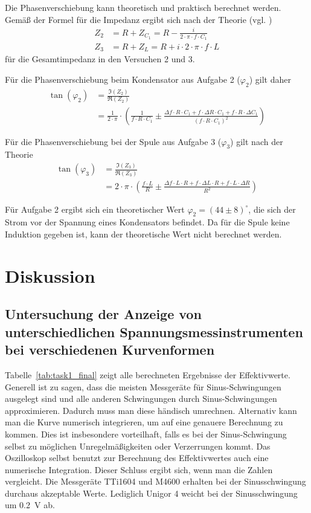 \documentclass{article}
\begin{document}
Die Phasenverschiebung kann theoretisch und praktisch berechnet werden. Gemäß der Formel für die Impedanz ergibt sich nach der Theorie (vgl. \cite{demtroeder})
\begin{align*}
Z_2 &= R + Z_{C_1} = R - \frac{i}{2\cdot\pi\cdot f \cdot C_1} \\
Z_3 &= R + Z_{L} = R + i\cdot 2\cdot\pi\cdot f \cdot L
\end{align*}
für die Gesamtimpedanz in den Versuchen 2 und 3.

Für die Phasenverschiebung beim Kondensator aus Aufgabe 2 ($\varphi_2$) gilt daher
\begin{align*}
\tan\left(\varphi_2\right) &= \frac{\Im(Z_2)}{\Re(Z_2)} \\
&= \frac{1}{2\cdot\pi} \cdot\left(\frac{1}{ f\cdot R \cdot C_1} \pm  \frac{\Delta f\cdot R \cdot C_1 + f\cdot \Delta R \cdot C_1 + f\cdot R \cdot \Delta C_1}{ (f \cdot R\cdot C_1)^2} \right)
\end{align*}

Für die Phasenverschiebung bei der Spule aus Aufgabe 3 ($\varphi_3$) gilt nach der Theorie
\begin{align*}
\tan\left(\varphi_3\right) &= \frac{\Im(Z_3)}{\Re(Z_3)} \\
&= 2\cdot \pi\cdot \left( \frac{f \cdot L}{R} \pm \frac{\Delta f\cdot L\cdot R + f\cdot \Delta L\cdot R + f\cdot L \cdot \Delta R}{R^2} \right)
\end{align*}


Für Aufgabe 2 ergibt sich ein theoretischer Wert $\varphi_2 = (44 \pm 8)^\circ$, die sich der Strom vor der Spannung eines Kondensators befindet. Da für die Spule keine Induktion gegeben ist, kann der theoretische Wert nicht berechnet werden.



\section{Diskussion}


\subsection{Untersuchung  der  Anzeige  von  unterschiedlichen  Spannungsmessinstrumenten  bei verschiedenen Kurvenformen }

Tabelle~\ref{tab:task1_final} zeigt alle berechneten Ergebnisse der Effektivwerte. Generell ist zu sagen, dass die meisten Messgeräte für Sinus-Schwingungen ausgelegt sind und alle anderen Schwingungen durch Sinus-Schwingungen approximieren. Dadurch muss man diese händisch umrechnen. Alternativ kann man die Kurve numerisch integrieren, um auf eine genauere Berechnung zu kommen. Dies ist insbesondere vorteilhaft, falls es bei der Sinus-Schwingung selbst zu möglichen Unregelmäßigkeiten oder Verzerrungen kommt. Das Oszilloskop selbst benutzt zur Berechnung des Effektivwertes auch eine numerische Integration. Dieser Schluss ergibt sich, wenn man die Zahlen vergleicht. Die Messgeräte TTi1604 und M4600 erhalten bei der Sinusschwingung durchaus akzeptable Werte. Lediglich Unigor 4 weicht bei der Sinusschwingung um 0.2~V ab.
\end{document}
